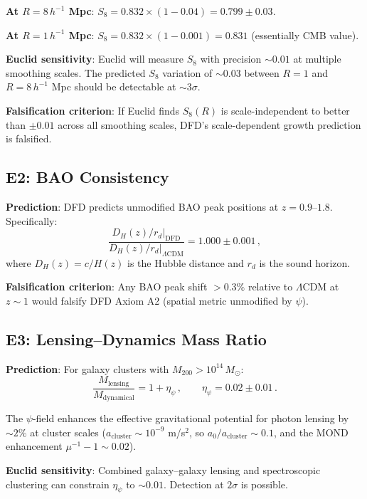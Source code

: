 \documentclass[11pt,a4paper]{article}
\begin{document}
\textbf{At $R = 8\,h^{-1}$ Mpc}: $S_8 = 0.832 \times (1 - 0.04) = 0.799 \pm 0.03$.

\textbf{At $R = 1\,h^{-1}$ Mpc}: $S_8 = 0.832 \times (1 - 0.001) = 0.831$ (essentially CMB value).

\textbf{Euclid sensitivity}: Euclid will measure $S_8$ with precision $\sim 0.01$ at multiple smoothing scales. The predicted $S_8$ variation of $\sim 0.03$ between $R = 1$ and $R = 8\,h^{-1}$ Mpc should be detectable at $\sim 3\sigma$.

\textbf{Falsification criterion}: If Euclid finds $S_8(R)$ is scale-independent to better than $\pm 0.01$ across all smoothing scales, DFD's scale-dependent growth prediction is falsified.

\subsection{E2: BAO Consistency}

\textbf{Prediction}: DFD predicts unmodified BAO peak positions at $z = 0.9$--$1.8$. Specifically:
\begin{equation}
\frac{D_H(z)/r_d|_{\mathrm{DFD}}}{D_H(z)/r_d|_{\Lambda\mathrm{CDM}}} = 1.000 \pm 0.001\,,
\end{equation}
where $D_H(z) = c/H(z)$ is the Hubble distance and $r_d$ is the sound horizon.

\textbf{Falsification criterion}: Any BAO peak shift $> 0.3\%$ relative to $\Lambda$CDM at $z \sim 1$ would falsify DFD Axiom A2 (spatial metric unmodified by $\psi$).

\subsection{E3: Lensing--Dynamics Mass Ratio}

\textbf{Prediction}: For galaxy clusters with $M_{200} > 10^{14}\,M_\odot$:
\begin{equation}
\frac{M_{\mathrm{lensing}}}{M_{\mathrm{dynamical}}} = 1 + \eta_\psi\,,\qquad \eta_\psi = 0.02 \pm 0.01\,.
\end{equation}

The $\psi$-field enhances the effective gravitational potential for photon lensing by $\sim 2\%$ at cluster scales ($a_{\mathrm{cluster}} \sim 10^{-9}$ m/s$^2$, so $a_0/a_{\mathrm{cluster}} \sim 0.1$, and the MOND enhancement $\mu^{-1} - 1 \sim 0.02$).

\textbf{Euclid sensitivity}: Combined galaxy--galaxy lensing and spectroscopic clustering can constrain $\eta_\psi$ to $\sim 0.01$. Detection at $2\sigma$ is possible.
\end{document}
